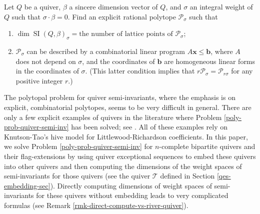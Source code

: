 \documentclass[11pt]{article}
\theoremstyle{definition}
\numberwithin{equation}{section}
\newcommand{\SI}{\operatorname{SI}}
\newcommand{\p}{\mathcal{P}}
\newcommand{\river}{\mathcal{T}}
\begin{document}
\begin{problem}\label{poly-prob-quiver-semi-inv}
Let $Q$ be a quiver, $\beta$ a sincere dimension vector of $Q$, and $\sigma$ an integral weight of $Q$ such that $\sigma \cdot \beta=0$. Find an explicit rational polytope $\p_{\sigma}$ such that

\begin{enumerate}
\item $\dim \SI(Q, \beta)_\sigma=\text{the number of lattice points of~} \p_{\sigma}$;

\item $\p_{\sigma}$ can be described by a combinatorial linear program $A\mathbf{x} \leq \mathbf{b}$, where $A$ does not depend on $\sigma$, and the coordinates of $\mathbf{b}$ are homogeneous linear forms in the coordinates of $\sigma$. (This latter condition implies that $r\p_\sigma=\p_{r \sigma}$ for any positive integer $r$.)
\end{enumerate}
\end{problem}
The polytopal problem for quiver semi-invariants, where the emphasis is on explicit, combinatorial polytopes,  seems to be very difficult in general. There are only a few explicit examples of quivers in the literature where Problem \ref{poly-prob-quiver-semi-inv} has been solved; see \cite{CDW, CC1, CC2, Col20, DW1}. All of these examples rely on Knutson-Tao's hive model for Littlewood-Richardson coefficients. In this paper, we solve Problem \ref{poly-prob-quiver-semi-inv} for $n$-complete bipartite quivers and their flag-extensions by using quiver exceptional sequences to embed these quivers into other quivers and then computing the dimensions of the weight spaces  of semi-invariants for those quivers (see the quiver $\river$ defined in Section \ref{qes-embedding-sec}). Directly computing dimensions of weight spaces of semi-invariants for these quivers without embedding leads to very complicated formulas (see Remark \ref{rmk-direct-compute-vs-river-quiver}).
\end{document}
